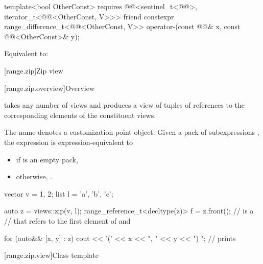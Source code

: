 %
\begin{itemdecl}
template<bool OtherConst>
  requires @@<sentinel_t<@@>, iterator_t<@@<OtherConst, V>>>
friend constexpr range_difference_t<@@<OtherConst, V>>
  operator-(const @@& x, const @@<OtherConst>& y);
\end{itemdecl}

\begin{itemdescr}
\pnum
\effects
Equivalent to: 
\end{itemdescr}

[range.zip]{Zip view}

[range.zip.overview]{Overview}

\pnum
{}%
 takes any number of views and
produces a view of tuples of references
to the corresponding elements of the constituent views.

\pnum
{}%
The name  denotes
a customization point object.
Given a pack of subexpressions ,
the expression  is expression-equivalent to
\begin{itemize}
\item
{}
if  is an empty pack,
\item
otherwise, .
\end{itemize}

\begin{example}
\begin{codeblock}
vector v = {1, 2};
list l = {'a', 'b', 'c'};

auto z = views::zip(v, l);
range_reference_t<decltype(z)> f = z.front();   //  is a 
                                                // that refers to the first element of  and 

for (auto&& [x, y] : z) {
  cout << '(' << x << ", " << y << ") ";        // prints 
}
\end{codeblock}
\end{example}

[range.zip.view]{Class template }

